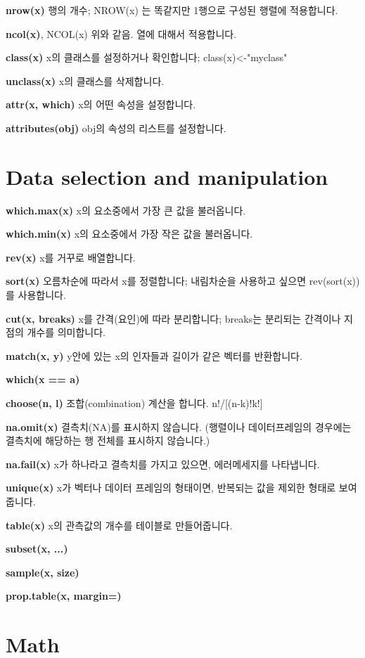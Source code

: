 \documentclass[landscape,twocolumn,letterpaper]{article}
\begin{document}
\textbf{nrow(x)} 행의 개수; NROW(x) 는 똑같지만 1행으로 구성된 행렬에 적용합니다.

\textbf{ncol(x)}, NCOL(x) 위와 같음. 열에 대해서 적용합니다.

\textbf{class(x)} x의 클래스를 설정하거나 확인합니다; class(x)<-"myclass"

\textbf{unclass(x)} x의 클래스를 삭제합니다.

\textbf{attr(x, which)} x의 어떤 속성을 설정합니다.

\textbf{attributes(obj) }obj의 속성의 리스트를 설정합니다.


\section{Data selection and manipulation}

\textbf{which.max(x)} x의 요소중에서 가장 큰 값을 불러옵니다.

\textbf{which.min(x) }x의 요소중에서 가장 작은 값을 불러옵니다.

\textbf{rev(x) }x를 거꾸로 배열합니다.

\textbf{sort(x) }오름차순에 따라서 x를 정렬합니다; 내림차순을 사용하고 싶으면 rev(sort(x))를 사용합니다.

\textbf{cut(x, breaks)} x를 간격(요인)에 따라 분리합니다; breaks는 분리되는 간격이나 지점의 개수를 의미합니다.

\textbf{match(x, y)} y안에 있는 x의 인자들과 길이가 같은 벡터를 반환합니다.

\textbf{which(x == a)}

\textbf{choose(n, l)} 조합(combination) 계산을 합니다. n!/[(n-k)!k!]

\textbf{na.omit(x)} 결측치(NA)를 표시하지 않습니다. (행렬이나 데이터프레임의 경우에는 결측치에 해당하는 행 전체를 표시하지
않습니다.)

\textbf{na.fail(x)} x가 하나라고 결측치를 가지고 있으면, 에러메세지를 나타냅니다.

\textbf{unique(x)} x가 벡터나 데이터 프레임의 형태이면, 반복되는 값을 제외한 형태로 보여줍니다.

\textbf{table(x)} x의 관측값의 개수를 테이블로 만들어줍니다.

\textbf{subset(x, ...)}

\textbf{sample(x, size)}

\textbf{prop.table(x, margin=)}


\section{Math}
\end{document}
